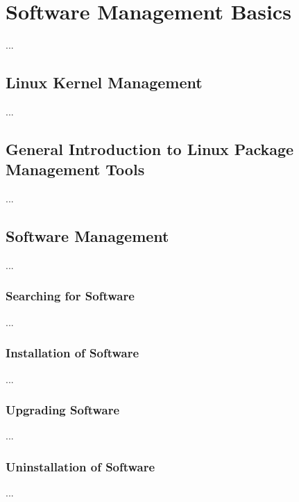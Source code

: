 \chapter{Software Management Basics}

...

\section{Linux Kernel Management}

...

\section{General Introduction to Linux Package Management Tools}

...

\section{Software Management}
...

\subsection{Searching for Software}
...

\subsection{Installation of Software}

...

\subsection{Upgrading Software}
...

\subsection{Uninstallation of Software}

...
















